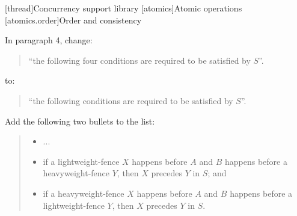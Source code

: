 

\setcounter{chapter}{32}
[thread]{Concurrency support library}
\setcounter{section}{4}
[atomics]{Atomic operations}
\setcounter{subsection}{3}
[atomics.order]{Order and consistency}

In  paragraph 4, change:

\begin{quote}
``the following four conditions are required to be satisfied by $S$''.
\end{quote}

to:

\begin{quote}
``the following conditions are required to be satisfied by $S$''.
\end{quote}

Add the following two bullets to the list:
\begin{quote}
\pnum
\begin{itemize}
\item
  ...
\item
if a  lightweight-fence $X$ happens before $A$ and $B$ happens
before a  heavyweight-fence $Y$, then $X$ precedes $Y$ in $S$; and
\item  if a  heavyweight-fence $X$ happens before $A$ and $B$ happens
before a  lightweight-fence $Y$, then $X$ precedes $Y$ in $S$.
\end{itemize}
\end{quote}
